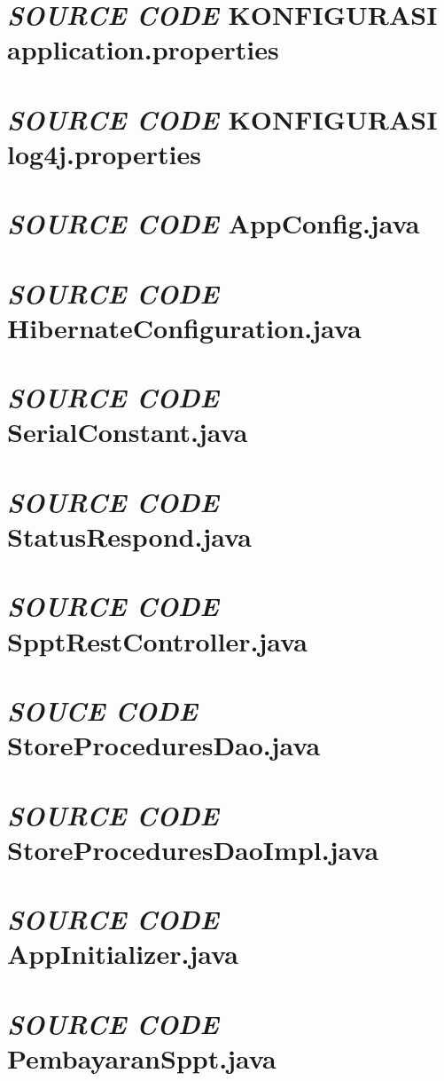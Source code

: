 \documentclass[pdftex,12pt, oneside]{article}
\begin{document}
\section{\textit{SOURCE CODE} KONFIGURASI application.properties}


\section{\textit{SOURCE CODE} KONFIGURASI log4j.properties}


\section{\textit{SOURCE CODE} AppConfig.java}


\section{\textit{SOURCE CODE} HibernateConfiguration.java}


\section{\textit{SOURCE CODE} SerialConstant.java}


\section{\textit{SOURCE CODE} StatusRespond.java}


\section{\textit{SOURCE CODE} SpptRestController.java}


\section{\textit{SOUCE CODE} StoreProceduresDao.java}


\section{\textit{SOURCE CODE} StoreProceduresDaoImpl.java}


\section{\textit{SOURCE CODE} AppInitializer.java}


\section{\textit{SOURCE CODE} PembayaranSppt.java}
\end{document}
